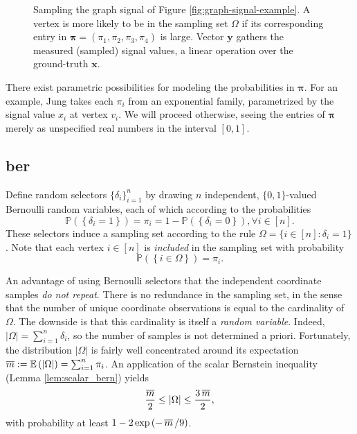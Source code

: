 \begin{figure}[H]
    \centering
    
    \caption[Sampling the graph signal]{Sampling the graph signal of Figure \ref{fig:graph-signal-example}. A vertex is more likely to be in the sampling set $\Omega$ if its corresponding entry in $\bm{\pi} = \left( \pi_1, \pi_2, \pi_3, \pi_4 \right)$ is large. Vector $\mathbf{y}$ gathers the measured (sampled) signal values, a linear operation over the ground-truth $\mathbf{x}$.}
    \label{fig:sampling-graph-signal-example}
\end{figure}

There exist parametric possibilities for modeling the probabilities in $\bm{\pi}$. For an example, Jung \cite{jung2018} takes each $\pi_i$ from an exponential family, parametrized by the signal value $x_i$ at vertex $v_i$. We will proceed otherwise, seeing the entries of $\bm{\pi}$ merely as unspecified real numbers in the interval $[0,1]$.


\subsection{\texorpdfstring{\acrfull{ber}}{Bernoulli Sampling Model}}\label{sec:ber}

Define random selectors $\{ \delta_i \}_{i=1}^n$ by drawing $n$ independent, $\{0, 1\}$-valued Bernoulli random variables, each of which according to the probabilities
\begin{equation}
    \mathbb{P} \left ( \left \{  \delta_i = 1 \right \}\right ) = \pi_i = 1 - \mathbb{P} \left ( \left \{  \delta_i = 0 \right \}\right ), \forall i \in [n].
\end{equation}
These selectors induce a sampling set according to the rule $\Omega = \{ i \in [n] : \delta_i = 1\}$. Note that each vertex $i \in [n]$ is \emph{included} in the sampling set with probability
\begin{equation*}
    \mathbb{P} \left ( \left \{  i \in \Omega \right \}\right ) = \pi_i.
\end{equation*}

An advantage of using Bernoulli selectors that the independent coordinate samples \emph{do not repeat}. There is no redundance in the sampling set, in the sense that the number of unique coordinate observations is equal to the cardinality of $\Omega$. The downside is that this cardinality is itself a \emph{random variable}. Indeed, $|\Omega| = \sum_{i=1}^{n} \delta_i$, so the number of samples is not determined a priori. Fortunately, the distribution $|\Omega|$ is fairly well concentrated around its expectation $\mathop{\overline{m}} := \mathbb{E} \left ( |\Omega| \right ) = \sum_{i=1}^{n} \pi_i$. An application of the scalar Bernstein inequality (Lemma \ref{lem:scalar_bern}) yields
\begin{equation}
    \frac{\mathop{\overline{m}}}{2} \leq |\Omega| \leq \frac{3 \mathop{\overline{m}}}{2},
\end{equation}
with probability at least $1 - 2 \exp \left ( -  \mathop{\overline{m}} / 9 \right )$.

